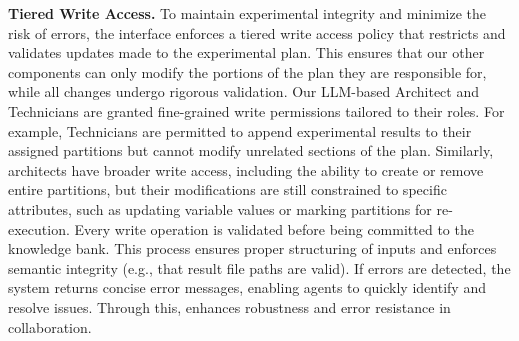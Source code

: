 \noindent\textbf{Tiered Write Access.}
To maintain experimental integrity and minimize the risk of errors, the interface enforces a tiered write access policy that restricts and validates updates made to the experimental plan. This ensures that our other components can only modify the portions of the plan they are responsible for, while all changes undergo rigorous validation.
Our LLM-based Architect and Technicians are granted fine-grained write permissions tailored to their roles. For example, Technicians are permitted to append experimental results to their assigned partitions but cannot modify unrelated sections of the plan. Similarly, architects have broader write access, including the ability to create or remove entire partitions, but their modifications are still constrained to specific attributes, such as updating variable values or marking partitions for re-execution.
Every write operation is validated before being committed to the knowledge bank. 
This process ensures proper structuring of inputs and enforces semantic integrity (e.g., that result file paths are valid). 
If errors are detected, the system returns concise error messages, enabling agents to quickly identify and resolve issues. 
Through this, \sys enhances robustness and error resistance in collaboration.


